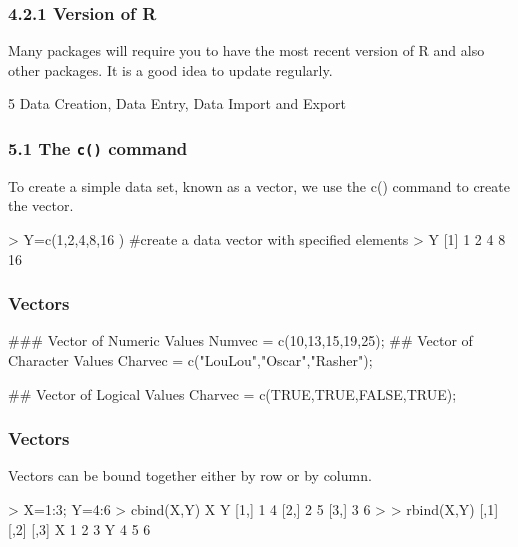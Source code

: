  
 
 \frametitle{4.2.1 Version of R}
 Many packages will require you to have the most recent version of R and also other packages.
 It is a good idea to update regularly.
 
 
 5 Data Creation, Data Entry, Data Import and Export
 
 
 \frametitle{5.1 The \texttt{c()} command}
 To create a simple data set, known as a vector, we use the c() command to create the vector.
 \begin{framed}
 \begin{semiverbatim}
 > Y=c(1,2,4,8,16 ) #create a data vector with specified elements
 > Y
 [1] 1 2 4 8 16
 
 \end{semiverbatim}
 \end{framed}
 
 
 
 \frametitle{Vectors}
 \begin{framed}
 \begin{semiverbatim}
 ### Vector of Numeric Values
 Numvec = c(10,13,15,19,25);
 ## Vector of Character Values
 Charvec = c("LouLou","Oscar","Rasher");
 
 ## Vector of Logical Values
 Charvec = c(TRUE,TRUE,FALSE,TRUE);
 \end{semiverbatim}
 \end{framed}
 
 
 \frametitle{Vectors}
 Vectors can be bound together either by row or by column.
 \begin{framed}
 \begin{semiverbatim}
 > X=1:3; Y=4:6
 > cbind(X,Y)
 X Y
 [1,] 1 4
 [2,] 2 5
 [3,] 3 6
 >
 > rbind(X,Y)
 [,1] [,2] [,3]
 X 1 2 3
 Y 4 5 6
 \end{semiverbatim}
 \end{framed}
 
 
